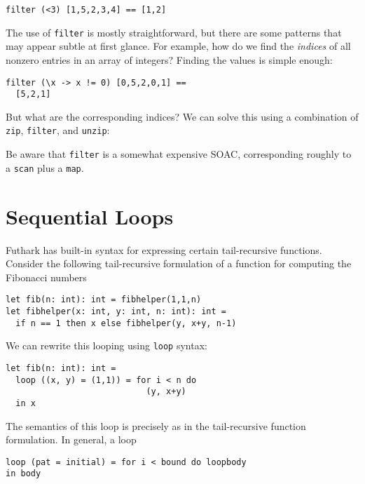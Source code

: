 \documentclass[oneside,11pt]{book}
\begin{document}
\begin{lstlisting}
filter (<3) [1,5,2,3,4] == [1,2]
\end{lstlisting}

The use of \texttt{filter} is mostly straightforward, but there are
some patterns that may appear subtle at first glance.  For example,
how do we find the \textit{indices} of all nonzero entries in an array
of integers?  Finding the values is simple enough:

\begin{lstlisting}
filter (\x -> x != 0) [0,5,2,0,1] ==
  [5,2,1]
\end{lstlisting}

\noindent
But what are the corresponding indices?  We can solve this using a
combination of \texttt{zip}, \texttt{filter}, and \texttt{unzip}:



\noindent
Be aware that \texttt{filter} is a somewhat expensive SOAC,
corresponding roughly to a \texttt{scan} plus a \texttt{map}.

\section{Sequential Loops}
\label{sec:sequential-loops}

Futhark has built-in syntax for expressing certain tail-recursive
functions.  Consider the following tail-recursive formulation of a
function for computing the Fibonacci numbers

\begin{lstlisting}
let fib(n: int): int = fibhelper(1,1,n)
let fibhelper(x: int, y: int, n: int): int =
  if n == 1 then x else fibhelper(y, x+y, n-1)
\end{lstlisting}

We can rewrite this looping using \texttt{loop} syntax:

\begin{lstlisting}
let fib(n: int): int =
  loop ((x, y) = (1,1)) = for i < n do
                            (y, x+y)
  in x
\end{lstlisting}

The semantics of this loop is precisely as in the tail-recursive function
formulation.  In general, a loop

\begin{lstlisting}
loop (pat = initial) = for i < bound do loopbody
in body
\end{lstlisting}
\end{document}
